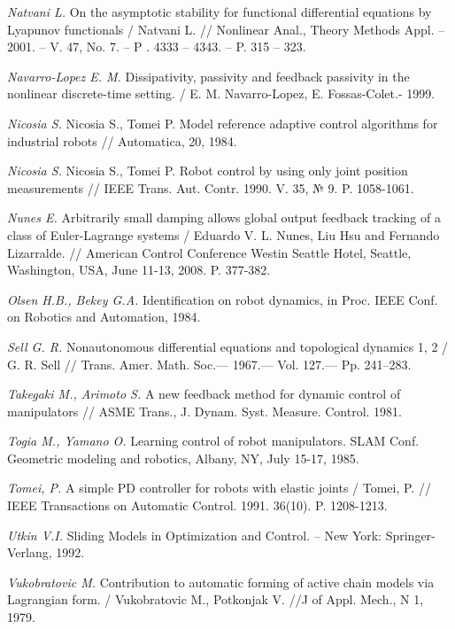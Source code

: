 \begin{thebibliography}{10}
	{\it Natvani L.} On the asymptotic stability for functional differential equations by Lyapunov functionals  / Natvani L. // Nonlinear Anal., 		Theory Methods Appl. – 2001. – V. 47, No. 7. – P . 4333 – 4343. – P. 315 – 323.
	
	{\it Navarro-Lopez E. M.} Dissipativity, passivity and feedback passivity in the nonlinear discrete-time setting. / E. M. Navarro-Lopez, E. 		Fossas-Colet.- 1999.
		
	{\it Nicosia S.} Nicosia S., Tomei P. Model reference adaptive control algorithms for industrial robots // Automatica, 20, 1984.	
	
	{\it Nicosia S.} Nicosia S., Tomei P. Robot control by using only joint position measurements // IEEE Trans. Aut. Contr. 1990. V. 35, № 9. P. 		1058-1061.

	{\it Nunes E.} Arbitrarily small damping allows global output feedback tracking of a class of Euler-Lagrange systems / Eduardo V. L. Nunes, Liu 	Hsu and Fernando Lizarralde. // American Control Conference Westin Seattle Hotel, Seattle, Washington, USA, June 11-13, 2008. P. 377-382.
	
	{\it Olsen H.B., Bekey G.A.} Identification on robot dynamics, in Proc. IEEE Conf. on Robotics and Automation, 1984.
	
	{\it Sell G. R.} Nonautonomous differential equations and topological dynamics 1, 2 /
	G. R. Sell // Trans. Amer. Math. Soc.— 1967.— Vol. 127.— Pp. 241–283.
	
	{\it Takegaki M., Arimoto S.} A new feedback method for dynamic control of manipulators // ASME Trans., J. Dynam. Syst. Measure. Control. 1981.
	
	{\it Togia M., Yamano O.} Learning control of robot manipulators. SLAM Conf. Geometric modeling and robotics, Albany, NY, July 15-17, 1985.
	
	{\it Tomei, P.} A simple PD controller for robots with elastic joints / Tomei, P. // IEEE Transactions on
	Automatic Control. 1991. 36(10). P. 1208-1213.
	
	{\it Utkin V.I.} Sliding Models in Optimization and Control. -- New York: Springer-Verlang, 1992.
	
	{\it Vukobratovic M.} Contribution to automatic forming of active chain models via Lagrangian form. / Vukobratovic M., Potkonjak V. //J of Appl. 	Mech., N 1, 1979.
	

\end{thebibliography}
